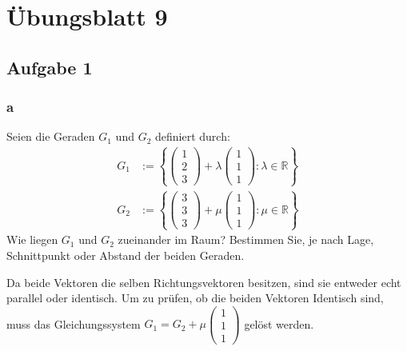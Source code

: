 \chapter{Übungsblatt 9}

\section{Aufgabe 1}

\subsection{a}
Seien die Geraden $G_1$ und $G_2$ definiert durch:
\begin{align*}
    G_1 & := \left\{\begin{pmatrix}
                        1 \\ 2 \\ 3
                    \end{pmatrix} + \lambda \begin{pmatrix}
                                                1 \\ 1 \\ 1
                                            \end{pmatrix}: \lambda \in \mathbb{R}\right\} \\
    G_2 & := \left\{\begin{pmatrix}
                        3 \\ 3 \\ 3
                    \end{pmatrix} + \mu \begin{pmatrix}
                                            1 \\ 1 \\ 1
                                        \end{pmatrix}: \mu \in \mathbb{R}\right\}
\end{align*}
Wie liegen $G_1$ und $G_2$ zueinander im Raum? Bestimmen Sie, je nach Lage, Schnittpunkt oder Abstand der beiden Geraden.

Da beide Vektoren die selben Richtungsvektoren besitzen, sind sie entweder echt
parallel oder identisch. Um zu prüfen, ob die beiden Vektoren Identisch sind,
muss das Gleichungssystem $G_1 = G_2 + \mu \begin{pmatrix}
        1 \\ 1 \\ 1
    \end{pmatrix}$ gelöst werden.

